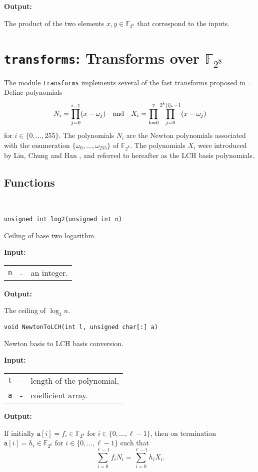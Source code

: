 \documentclass{amsart}
\makeatletter
\newcommand{\F}{\mathbb{F}}
\newcommand{\Input}{\textbf{Input:}}
\newcommand{\Output}{\textbf{Output:}}
\newcommand{\transforms}{\normalfont\texttt{transforms}}
\newcommand{\NtoX}{NewtonToLCH}
\let\originalleft\left
\let\originalright\right
\renewcommand{\left}{\mathopen{}\mathclose\bgroup\originalleft}
\renewcommand{\right}{\aftergroup\egroup\originalright}
\newenvironment{inputs}{\Input\par\begin{tabular}{@{}rcl}}{\end{tabular}}
\newenvironment{outputs}{\Output\par}{}
\makeatother
\begin{document}
\begin{outputs}
	The product of the two elements $x,y\in\F_{2^8}$ that correspond to the inputs.
\end{outputs}

\section{\transforms{}: Transforms over $\F_{2^8}$}

The module \transforms{} implements several of the fast transforms proposed
in~\cite{gao2010,lin2014,lin2016a,coxon2018b}. Define polynomials
\begin{equation*}
	N_i
	=
	\prod^{i-1}_{j=0}
	\left(x-\omega_j\right)
	\quad\text{and}\quad
	X_i
	=
	\prod^7_{k=0}
	\prod^{2^k[i]_k-1}_{j=0}
	\left(x-\omega_j\right)
\end{equation*}
for $i\in\{0,\dotsc,255\}$. The polynomials $N_i$ are the Newton polynomials
associated with the enumeration $\{\omega_0,\dotsc,\omega_{255}\}$ of
$\F_{2^8}$. The polynomials $X_i$ were introduced by Lin, Chung and Han
\cite{lin2014}, and referred to hereafter as the LCH basis polynomials.

\subsection{Functions}\

\texttt{unsigned int log2(unsigned int n)}

Ceiling of base two logarithm.

\begin{inputs}
	\texttt{n} & - & an integer.
\end{inputs}

\begin{outputs}
	The ceiling of $\log_2 n$.
\end{outputs}

\texttt{void \NtoX(int l, unsigned char[:]\ a)}

Newton basis to LCH basis conversion.

\begin{inputs}
	\texttt{l} & - & length of the polynomial, \\
	\texttt{a} & - & coefficient array.
\end{inputs}

\begin{outputs}
	If initially $\texttt{a}[i]=f_i\in\F_{2^8}$ for $i\in\{0,\dotsc,\ell-1\}$, then
	on termination $\texttt{a}[i]=h_i\in\F_{2^8}$ for $i\in\{0,\dotsc,\ell-1\}$ such
	that
	\begin{equation}\label{eqn:newton-lch}
		\sum^{\ell-1}_{i=0}f_iN_i
		=\sum^{\ell-1}_{i=0}h_iX_i.
	\end{equation}
\end{outputs}
\end{document}
